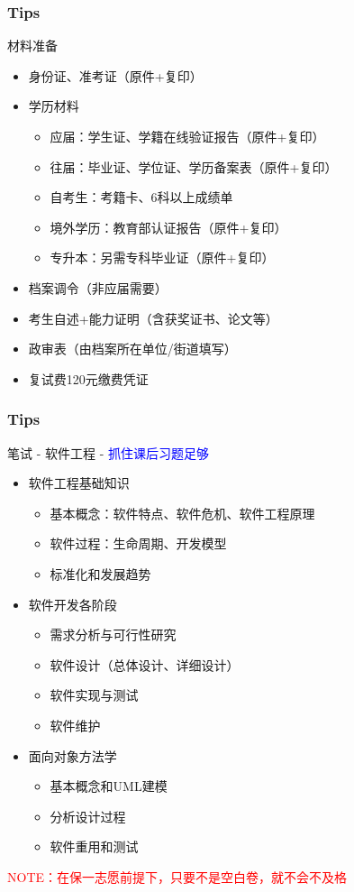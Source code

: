 \documentclass[slide]{../custom}
\begin{document}
\begin{frame}
  \frametitle{Tips}
  \begin{block}{材料准备}
    \begin{itemize}
      \item 身份证、准考证（原件+复印）
      \item 学历材料
        \begin{itemize}
          \item 应届：学生证、学籍在线验证报告（原件+复印）
          \item 往届：毕业证、学位证、学历备案表（原件+复印）
          \item 自考生：考籍卡、6科以上成绩单
          \item 境外学历：教育部认证报告（原件+复印）
          \item 专升本：另需专科毕业证（原件+复印）
        \end{itemize}
      \item 档案调令（非应届需要）
      \item 考生自述+能力证明（含获奖证书、论文等）
      \item 政审表（由档案所在单位/街道填写）
      \item 复试费120元缴费凭证
    \end{itemize}
  \end{block}
\end{frame}

\begin{frame}
  \frametitle{Tips}
  \begin{block}{笔试 - 软件工程 - \textcolor{blue}{抓住课后习题足够} }
    \begin{itemize}
      \item 软件工程基础知识
        \begin{itemize}
          \item 基本概念：软件特点、软件危机、软件工程原理
          \item 软件过程：生命周期、开发模型
          \item 标准化和发展趋势
        \end{itemize}
      \item 软件开发各阶段
        \begin{itemize}
          \item 需求分析与可行性研究
          \item 软件设计（总体设计、详细设计）
          \item 软件实现与测试
          \item 软件维护
        \end{itemize}
      \item 面向对象方法学
        \begin{itemize}
          \item 基本概念和UML建模
          \item 分析设计过程
          \item 软件重用和测试
        \end{itemize}
    \end{itemize}
    \textcolor{red}{NOTE：在保一志愿前提下，只要不是空白卷，就不会不及格}
  \end{block}
\end{frame}
\end{document}
